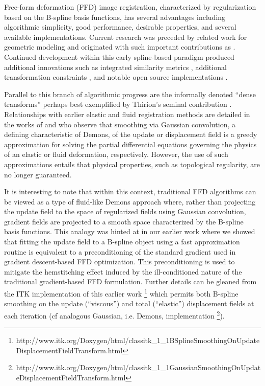 \documentclass{frontiersSCNS}
\begin{document}
Free-form deformation (FFD) image registration, characterized by  regularization based on the B-spline basis functions, has several
advantages including algorithmic simplicity,
good performance, desirable properties, and several available
implementations.  Current research was
preceded by related work for
geometric modeling \citep{sederberg1986} and originated with such important
contributions as \cite{szeliski1997,thevenaz1998,rueckert1999}.
Continued development within this early spline-based paradigm produced additional innovations such as integrated similarity metrics \citep[e.g.][]{mattes2003}, additional transformation constraints \citep[e.g.][]{rohlfing2003}, and notable open source implementations \citep[e.g.][]{ibanez2005,klein2010,shackleford2010}.

Parallel to this branch of algorithmic progress are the informally
denoted ``dense transforms''
perhaps best exemplified by Thirion's seminal contribution \citep{thirion1998}.
Relationships with earlier elastic \citep{bajcsy1989,gee1993} and fluid \citep{christensen1996} registration methods are detailed in
the works of \cite{bro-nielsen1996} and \cite{pennec1999} who observe that
smoothing via Gaussian convolution, a defining characteristic of Demons,
of the update or displacement
field is a greedy approximation for solving the partial differential equations governing
the physics of an elastic or fluid deformation, respectively.  However, the use of such
approximations entails that physical properties, such as topological
regularity, are no longer guaranteed.

It is interesting to note that within this context, traditional FFD algorithms
can be viewed as a type of fluid-like Demons approach
where, rather than projecting the update field to the space
of regularized fields using Gaussian convolution, gradient fields
are projected to a smooth space characterized by the B-spline
basis functions.  This analogy was hinted at in our earlier work \citep{tustison2009} where we showed that fitting the update field to a B-spline object using a fast approximation routine \citep{tustison2006} is equivalent to a preconditioning of the standard gradient used in gradient descent-based FFD optimization.
This preconditioning is used to mitigate the hemstitching effect induced by the ill-conditioned nature of the traditional gradient-based FFD formulation.
Further details can be gleaned from the ITK implementation of this
earlier work%
\footnote{
http://www.itk.org/Doxygen/html/classitk\_1\_1BSplineSmoothingOnUpdateDisplacementFieldTransform.html
}
which permits both B-spline smoothing on the update (``viscous'') and total (``elastic'')
displacement fields at each iteration (cf
analogous Gaussian, i.e. Demons, implementation%
\footnote{
http://www.itk.org/Doxygen/html/classitk\_1\_1GaussianSmoothingOnUpdateDisplacementFieldTransform.html
}).
\end{document}
